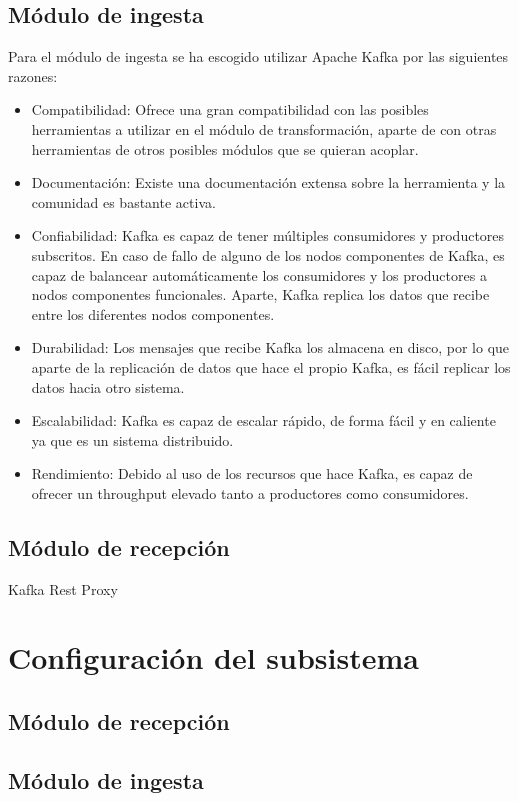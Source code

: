 \subsection{Módulo de ingesta}
Para el módulo de ingesta se ha escogido utilizar Apache Kafka\cite{Tfg:kafka} por las siguientes razones:

\begin{itemize}
	\item Compatibilidad: Ofrece una gran compatibilidad con las posibles herramientas a utilizar en el módulo de transformación, aparte de con otras herramientas de otros posibles módulos que se quieran acoplar.
	
	\item Documentación: Existe una documentación extensa sobre la herramienta y la comunidad es bastante activa.
	
	\item Confiabilidad: Kafka es capaz de tener múltiples consumidores y productores subscritos. En caso de fallo de alguno de los nodos componentes de Kafka, es capaz de balancear automáticamente los consumidores y los productores a nodos componentes funcionales. Aparte, Kafka replica los datos que recibe entre los diferentes nodos componentes.
	
	\item Durabilidad: Los mensajes que recibe Kafka los almacena en disco, por lo que aparte de la replicación de datos que hace el propio Kafka, es fácil replicar los datos hacia otro sistema.
	
	\item Escalabilidad: Kafka es capaz de escalar rápido, de forma fácil y en caliente ya que es un sistema distribuido.
	
	\item Rendimiento: Debido al uso de los recursos que hace Kafka, es capaz de ofrecer un throughput elevado tanto a productores como consumidores.
\end{itemize}

\subsection{Módulo de recepción}
Kafka Rest Proxy\cite{Tfg:kafkarestproxy}

\section{Configuración del subsistema}

\subsection{Módulo de recepción}
\subsection{Módulo de ingesta}

